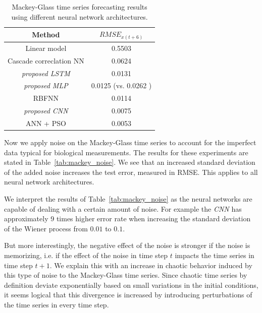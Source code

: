 \begin{table}
    \centering
    \begin{tabular}{c|c}
        Method                         & $RMSE_{x(t+6)}$                          \\
        \hline
        Linear model                   & 0.5503                                   \\
        Cascade correclation NN        & 0.0624                                   \\
        \textit{proposed LSTM}         & 0.0131                                   \\
        \textit{proposed MLP}          & 0.0125 (vs. 0.0262 \cite{lopez2016}) \\
        RBFNN                          & 0.0114                                   \\
        \textit{proposed CNN}          & 0.0075                                   \\
        ANN + PSO \cite{lopez2016} & 0.0053                                   \\
    \end{tabular}
    \caption{Mackey-Glass time series forecasting results using different neural
        network architectures.}
    \label{tab:mackey_results}
\end{table}

Now we apply noise on the Mackey-Glass time series to account for the imperfect
data typical for biological measurements. The results for these
experiments are stated in Table~\ref{tab:mackey_noise}. We see that an increased
standard deviation of the added noise increases the test error, measured in
RMSE. This applies to all neural network architectures.

We interpret the results of Table~\ref{tab:mackey_noise}
as the neural networks are capable of dealing with a certain
amount of noise. For example the \emph{CNN} has
approximately 9 times higher error rate when increasing the standard 
deviation of the Wiener process from $0.01$ to $0.1$.

But more interestingly,
the negative effect of the noise is stronger if the noise is memorizing, i.e. if
the effect of the noise in time step $t$ impacts the time series in time step
$t + 1$. We explain this with an increase in chaotic behavior induced by this
type of noise to the Mackey-Glass time series. Since chaotic time series by
definition deviate exponentially based on small variations in the initial
conditions, it seems logical that this divergence is increased by introducing
perturbations of the time series in every time step.

